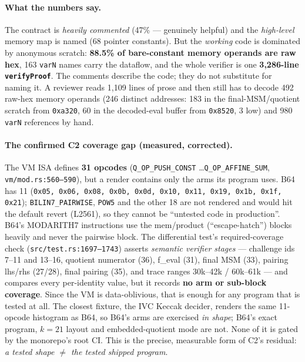 \paragraph{What the numbers say.}
The contract is \emph{heavily commented} (47\% --- genuinely
helpful) and the \emph{high-level} memory map is named (68
pointer constants). But the \emph{working} code is dominated by
anonymous scratch: \textbf{88.5\% of bare-constant memory
operands are raw hex}, 163 \texttt{varN} names carry the
dataflow, and the whole verifier is one \textbf{3{,}286-line
\texttt{verifyProof}}. The comments describe the code; they do
not substitute for naming it. A reviewer reads 1{,}109 lines of
prose and then still has to decode 492 raw-hex memory operands
(246 distinct addresses: 183 in the final-MSM/quotient scratch
from \texttt{0xa320}, 60 in the decoded-eval buffer from
\texttt{0x8520}, 3 low) and 980 \texttt{varN} references by hand.

\paragraph{The confirmed C2 coverage gap (measured, corrected).}
The VM ISA defines \textbf{31 opcodes} (\texttt{Q\_\allowbreak{}OP\_\allowbreak{}PUSH\_\allowbreak{}CONST}
\ldots \texttt{Q\_\allowbreak{}OP\_\allowbreak{}AFFINE\_\allowbreak{}SUM}, \texttt{vm/\allowbreak{}mod.rs:560--590}), but a
render contains only the arms its program uses. B64 has 11
(\texttt{0x05, 0x06, 0x08, 0x0b, 0x0d, 0x10, 0x11, 0x19, 0x1b,
0x1f, 0x21}); \texttt{BILIN7\_PAIRWISE}, \texttt{POW5} and the
other 18 are not rendered and would hit the default revert (L2561),
so they cannot be ``untested code in production''. B64's MODARITH7
instructions use the mem/product (``escape-hatch'') blocks heavily
and never the pairwise block. The differential test's
required-coverage check (\texttt{src/\allowbreak{}test.rs:1697--1743}) asserts
\emph{semantic verifier stages} --- challenge ids 7--11 and 13--16,
quotient numerator (36), f\_eval (31),
final MSM (33), pairing lhs/rhs (27/28), final pairing (35),
and trace ranges 30k--42k / 60k--61k --- and compares every
per-identity value, but it records \textbf{no arm or sub-block
coverage}. Since the VM is data-oblivious, that is enough for any
program that is tested at all. The closest fixture, the IVC Keccak
decider, renders the same 11-opcode histogram as B64, so B64's arms
are exercised \emph{in shape}; B64's exact program, $k{=}21$ layout and
embedded-quotient mode are not. None of it is gated by the monorepo's
root CI. This is the precise, measurable form of C2's residual:
\emph{a tested shape $\neq$ the tested shipped program}.

